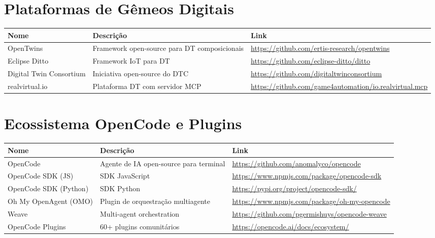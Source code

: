 
\section{Plataformas de Gêmeos Digitais}

\begin{tabularx}{\textwidth}{|l|X|X|}
\hline
\textbf{Nome} & \textbf{Descrição} & \textbf{Link} \\
\hline
OpenTwins & Framework open-source para DT composicionais & \url{https://github.com/ertis-research/opentwins} \\
\hline
Eclipse Ditto & Framework IoT para DT & \url{https://github.com/eclipse-ditto/ditto} \\
\hline
Digital Twin Consortium & Iniciativa open-source do DTC & \url{https://github.com/digitaltwinconsortium} \\
\hline
realvirtual.io & Plataforma DT com servidor MCP & \url{https://github.com/game4automation/io.realvirtual.mcp} \\
\hline
\end{tabularx}

\section{Ecossistema OpenCode e Plugins}

\begin{tabularx}{\textwidth}{|l|X|X|}
\hline
\textbf{Nome} & \textbf{Descrição} & \textbf{Link} \\
\hline
OpenCode & Agente de IA open-source para terminal & \url{https://github.com/anomalyco/opencode} \\
\hline
OpenCode SDK (JS) & SDK JavaScript & \url{https://www.npmjs.com/package/opencode-sdk} \\
\hline
OpenCode SDK (Python) & SDK Python & \url{https://pypi.org/project/opencode-sdk/} \\
\hline
Oh My OpenAgent (OMO) & Plugin de orquestração multiagente & \url{https://www.npmjs.com/package/oh-my-opencode} \\
\hline
Weave & Multi-agent orchestration & \url{https://github.com/pgermishuys/opencode-weave} \\
\hline
OpenCode Plugins & 60+ plugins comunitários & \url{https://opencode.ai/docs/ecosystem/} \\
\hline
\end{tabularx}

